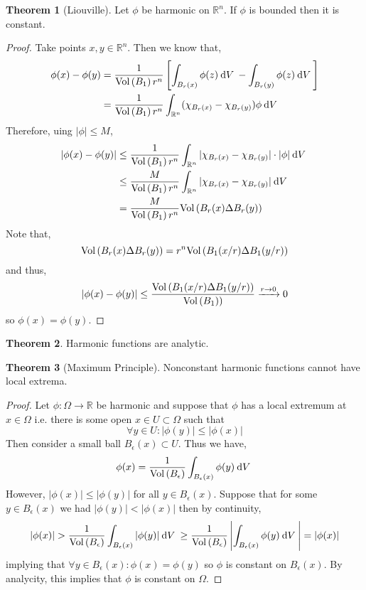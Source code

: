 \documentclass[12pt]{extarticle}
\newcommand{\R}{\mathbb{R}}
\renewcommand{\d}[1]{ \mathrm{d}#1 \:}
\theoremstyle{definition}
\newtheorem{theorem}{Theorem}[section]
\begin{document}
\begin{theorem}[Liouville]
Let $\phi$ be harmonic on $\R^n$. If $\phi$ is bounded then it is constant. 
\end{theorem}

\begin{proof}
Take points $x, y \in \R^n$. Then we know that,
\begin{align*}
\phi(x) - \phi(y) & = \frac{1}{\Vol{B_1} r^n} \left[ \int_{B_r(x)} \phi(z) \: \d{V} - \int_{B_r(y)} \phi(z) \: \d{V} \right]
\\
& = \frac{1}{\Vol{B_1} r^n} \int_{\R^n}  (\chi_{B_r(x)} - \chi_{B_r(y)}) \phi  \: \d{V} 
\end{align*}
Therefore, uing $|\phi| \le M$,
\begin{align*}
|\phi(x) - \phi(y)| & \le \frac{1}{\Vol{B_1} r^n} \int_{\R^n} | \chi_{B_r(x)} - \chi_{B_r(y)}| \cdot | \phi | \: \d{V}
\\
& \le \frac{M}{\Vol{B_1} r^n} \int_{\R^n} | \chi_{B_r(x)} - \chi_{B_r(y)}| \: \d{V}
\\
& = \frac{M}{\Vol{B_1} r^n} \Vol{B_r(x) \Delta B_r(y)}
\end{align*}
Note that,
\[ \mathrm{Vol}\left( B_r(x) \Delta B_r(y) \right) = r^n \mathrm{Vol}\left( B_1(x/r) \Delta B_1(y/r) \right) \]
and thus,
\[ |\phi(x) - \phi(y)| \le \frac{\mathrm{Vol}\left( B_1(x/r) \Delta B_1(y/r) \right)}{\mathrm{Vol}\left( B_1) \right)} \xrightarrow{r \to 0} 0 \]
so $\phi(x) = \phi(y)$. 
\end{proof}

\begin{theorem}
Harmonic functions are analytic.
\end{theorem}

\begin{theorem}[Maximum Principle]
Nonconstant harmonic functions cannot have local extrema. 
\end{theorem}

\begin{proof}
Let $\phi : \Omega \to \R$ be harmonic and suppose that $\phi$ has a local extremum at $x \in \Omega$ i.e. there is some open $x \in U \subset \Omega$ such that
\[ \forall y \in U : |\phi(y)| \le |\phi(x)| \]
Then consider a small ball $B_\epsilon(x) \subset U$. Thus we have,
\[ \phi(x) = \frac{1}{\Vol{B_\epsilon}} \int_{B_\epsilon(x)} \phi(y) \: \d{V} \]
However, $|\phi(x)| \le |\phi(y)|$ for all $y \in B_\epsilon(x)$. Suppose that for some $y \in B_\epsilon(x)$ we had $|\phi(y)| < |\phi(x)|$ then by continuity,
\[ |\phi(x)| > \frac{1}{\Vol{B_\epsilon}} \int_{B_\epsilon(x)} | \phi(y) | \: \d{V} \ge \frac{1}{\Vol{B_\epsilon}} \left| \int_{B_\epsilon(x)}  \phi(y) \: \d{V} \right| = |\phi(x)| \]
implying that $\forall y \in B_\epsilon(x) : \phi(x) = \phi(y)$ so $\phi$ is constant on $B_\epsilon(x)$. By analycity, this implies that $\phi$ is constant on $\Omega$. 
\end{proof}
\end{document}
